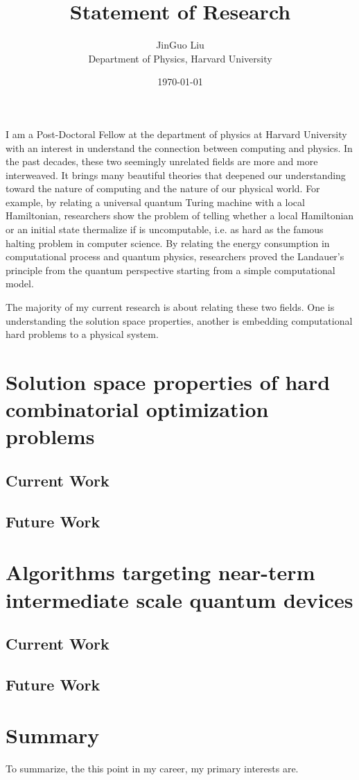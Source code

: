 \documentclass[a4paper]{article}
\title{Statement of Research}
\author{JinGuo Liu\\ Department of Physics, Harvard University}
\date{\today}
\newcommand{\<}{\langle}
\renewcommand{\>}{\rangle}
\begin{document}
\fontsize{10}{13}
\selectfont
\maketitle

I am a Post-Doctoral Fellow at the department of physics at Harvard University with an interest in understand the connection between computing and physics.
In the past decades, these two seemingly unrelated fields are more and more interweaved.
It brings many beautiful theories that deepened our understanding toward the nature of computing and the nature of our physical world.
For example, by relating a universal quantum Turing machine with a local Hamiltonian,
researchers show the problem of telling whether a local Hamiltonian or an initial state thermalize if is uncomputable,
i.e. as hard as the famous halting problem in computer science.
By relating the energy consumption in computational process and quantum physics,
researchers proved the Landauer's principle from the quantum perspective starting from a simple computational model.

The majority of my current research is about relating these two fields.
One is understanding the solution space properties,
another is embedding computational hard problems to a physical system.

\section{Solution space properties of hard combinatorial optimization problems}

\subsection{Current Work}
\subsection{Future Work}

\section{Algorithms targeting near-term intermediate scale quantum devices}
\subsection{Current Work}
\subsection{Future Work}

\section{Summary}
To summarize, the this point in my career, my primary interests are.
\end{document}
